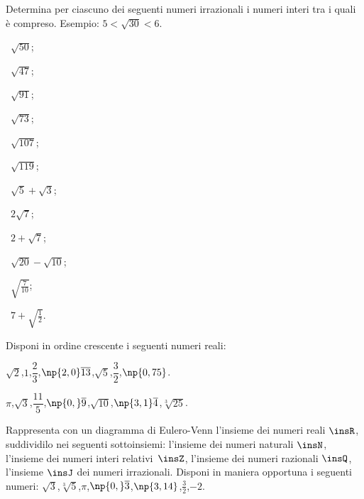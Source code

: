 \begin{esercizio}[\Ast]
\label{ese:1.3}
Determina per ciascuno dei seguenti numeri irrazionali i numeri interi tra i quali è compreso. Esempio: $5<\sqrt{30}<6$.
\begin{multicols}{3}
\begin{enumeratea}
 \item~$\sqrt{50}$;
 \item~$\sqrt{47}$;
 \item~$\sqrt{91}$;
 \item~$\sqrt{73}$;
 \item~$\sqrt{107}$;
 \item~$\sqrt{119}$;
 \item~$\sqrt{5}+\sqrt{3}$;
 \item~$2\sqrt{7}$;
 \item~$2+\sqrt{7}$;
 \item~$\sqrt{20}-\sqrt{10}$;
 \item~$\sqrt{\frac{7}{10}}$;
 \item~$7+\sqrt{\frac{1}{2}}$.
\end{enumeratea}
\end{multicols}
\end{esercizio}

\begin{esercizio}
\label{ese:1.4}
 Disponi in ordine crescente i seguenti numeri reali:
 \begin{enumeratea}
 \item $\sqrt{2}$,\quad $1$,\quad $\dfrac{2}{3}$,\quad $\np{2,0}\overline{13}$,\quad $\sqrt{5}$,\quad $\dfrac{3}{2}$,\quad $\np{0,75}$.
 \item $\pi$,\quad $\sqrt{3}$,\quad $\dfrac{11}{5}$,\quad $\np{0,}\overline{9}$,\quad $\sqrt{10}$,\quad $\np{3,1}\overline{4}$,\quad $\sqrt[3]{25}$.
 \end{enumeratea}
\end{esercizio}

\begin{esercizio}
\label{ese:1.5}
 Rappresenta con un diagramma di Eulero-Venn l'insieme dei numeri reali $\insR$, suddividilo nei seguenti sottoinsiemi: l'insieme dei numeri naturali $\insN$, l'insieme dei numeri interi relativi~$\insZ$, l'insieme dei numeri razionali $\insQ$, l'insieme $\insJ$ dei numeri irrazionali. Disponi in maniera opportuna i seguenti numeri: $\sqrt{3}$,\quad $\sqrt[3]{5}$,\quad$\pi$,\quad $\np{0,}\overline{3}$,\quad $\np{3,14}$,\quad $\frac{3}{2}$,\quad$-2$.
\end{esercizio}

